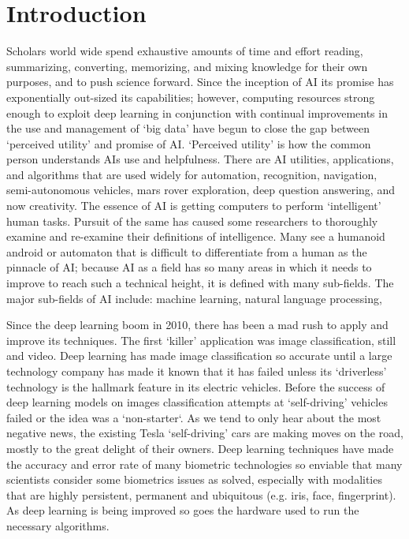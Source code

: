 \section{Introduction}


\noindent Scholars world wide spend exhaustive amounts of time and effort reading, summarizing, converting, memorizing, and mixing knowledge for their own purposes, and to push science forward.
Since the inception of AI its promise has exponentially out-sized its capabilities; however, computing resources strong enough to exploit deep learning in conjunction with continual improvements in the use and management of `big data' have begun to close the gap between `perceived utility' and promise of AI.
`Perceived utility' is how the common person understands AIs use and helpfulness.
There are AI utilities, applications, and algorithms that are used widely for automation, recognition, navigation, semi-autonomous vehicles, mars rover exploration, deep question answering, and now creativity.
The essence of AI is getting computers to perform `intelligent' human tasks.
Pursuit of the same has caused some researchers to thoroughly examine and re-examine their definitions of intelligence.
Many see a humanoid android or automaton that is difficult to differentiate from a human as the pinnacle of AI; because AI as a field has so many areas in which it needs to improve to reach such a technical height, it is defined with many sub-fields.
The major sub-fields of AI include: machine learning, natural language processing, 
\cite{Azaria:2022} \cite{Zhang:2023} \cite{Foucart:2023} \cite{DePeau-Wilson:2023}

Since the deep learning boom in 2010, there has been a mad rush to apply and improve its techniques.
The first `killer' application was image classification, still and video.
Deep learning has made image classification so accurate until a large technology company has made it known that it has failed unless its `driverless' technology is the hallmark feature in its electric vehicles. 
Before the success of deep learning models on images classification attempts at `self-driving' vehicles failed or the idea was a `non-starter`.
As we tend to only hear about the most negative news, the existing Tesla `self-driving' cars are making moves on the road, mostly to the great delight of their owners.
Deep learning techniques have made the accuracy and error rate of many biometric technologies so enviable that many scientists consider some biometrics issues as solved, especially with modalities that are highly persistent, permanent and ubiquitous (e.g. iris, face, fingerprint).
As deep learning is being improved so goes the hardware used to run the necessary algorithms.

